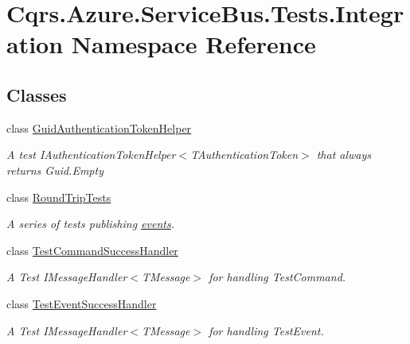 \hypertarget{namespaceCqrs_1_1Azure_1_1ServiceBus_1_1Tests_1_1Integration}{}\section{Cqrs.\+Azure.\+Service\+Bus.\+Tests.\+Integration Namespace Reference}
\label{namespaceCqrs_1_1Azure_1_1ServiceBus_1_1Tests_1_1Integration}
\subsection*{Classes}
\begin{DoxyCompactItemize}
\item 
class \hyperlink{classCqrs_1_1Azure_1_1ServiceBus_1_1Tests_1_1Integration_1_1GuidAuthenticationTokenHelper}{Guid\+Authentication\+Token\+Helper}
\begin{DoxyCompactList}\small\item\em A test I\+Authentication\+Token\+Helper$<$\+T\+Authentication\+Token$>$ that always returns Guid.\+Empty \end{DoxyCompactList}\item 
class \hyperlink{classCqrs_1_1Azure_1_1ServiceBus_1_1Tests_1_1Integration_1_1RoundTripTests}{Round\+Trip\+Tests}
\begin{DoxyCompactList}\small\item\em A series of tests publishing \hyperlink{}{events}. \end{DoxyCompactList}\item 
class \hyperlink{classCqrs_1_1Azure_1_1ServiceBus_1_1Tests_1_1Integration_1_1TestCommandSuccessHandler}{Test\+Command\+Success\+Handler}
\begin{DoxyCompactList}\small\item\em A Test I\+Message\+Handler$<$\+T\+Message$>$ for handling Test\+Command. \end{DoxyCompactList}\item 
class \hyperlink{classCqrs_1_1Azure_1_1ServiceBus_1_1Tests_1_1Integration_1_1TestEventSuccessHandler}{Test\+Event\+Success\+Handler}
\begin{DoxyCompactList}\small\item\em A Test I\+Message\+Handler$<$\+T\+Message$>$ for handling Test\+Event. \end{DoxyCompactList}\end{DoxyCompactItemize}
